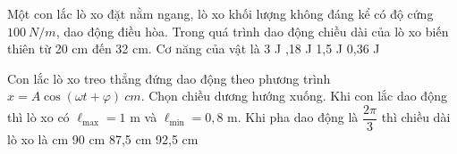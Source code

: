 \begin{vidu}%
Một con lắc lò xo đặt nằm ngang, lò xo khối lượng không đáng kể có độ cứng $100\ N/m$, dao động điều hòa. Trong quá trình dao động chiều dài của lò xo biến thiên từ 20 cm đến 32 cm. Cơ năng của vật là
\choice
{3 J}
{,18 J}
{1,5 J}
{0,36 J}
\end{vidu} %
\begin{vidu}%
Con lắc lò xo treo thẳng đứng dao động theo phương trình $x=A\cos  (\omega t+\varphi )\ cm.$ Chọn chiều dương hướng xuống. Khi con lắc dao động thì lò xo có $\ell_{\max} = 1$ m và $\ell_{\min} = 0,8$ m. Khi pha dao động là $\dfrac{2\pi}{3}$ thì chiều dài lò xo là
\choice
{ cm}
{90 cm}
{87,5 cm}
{92,5 cm}
\end{vidu} %
